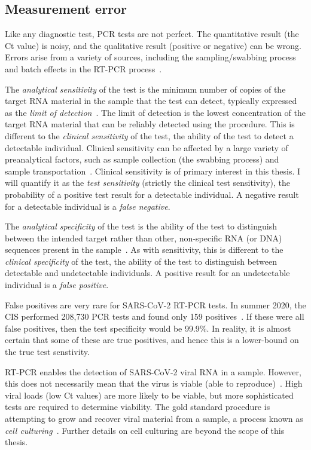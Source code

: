 \documentclass[thesis.tex]{subfiles}
\begin{document}
\subsection{Measurement error} \label{biology-data:sec:measurement-error}

Like any diagnostic test, PCR tests are not perfect.
The quantitative result (the Ct value) is noisy, and the qualitative result (positive or negative) can be wrong.
Errors arise from a variety of sources, including the sampling/swabbing process and batch effects in the RT-PCR process~\autocite{hanRTPCR}.

The \emph{analytical sensitivity} of the test is the minimum number of copies of the target RNA material in the sample that the test can detect, typically expressed as the \emph{limit of detection}~\autocite{bustinMIQE}.
The limit of detection is the lowest concentration of the target RNA material that can be reliably detected using the procedure.
This is different to the \emph{clinical sensitivity} of the test, the ability of the test to detect a detectable individual.
Clinical sensitivity can be affected by a large variety of preanalytical factors, such as sample collection (\ie the swabbing process) and sample transportation~\autocite{lippiPotential}.
Clinical sensitivity is of primary interest in this thesis.
I will quantify it as the \emph{test sensitivity} (strictly the clinical test sensitivity), the probability of a positive test result for a detectable individual.
A negative result for a detectable individual is a \emph{false negative}.

The \emph{analytical specificity} of the test is the ability of the test to distinguish between the intended target rather than other, non-specific RNA (or DNA) sequences present in the sample~\autocite{bustinMIQE}.
As with sensitivity, this is different to the \emph{clinical specificity} of the test, the ability of the test to distinguish between detectable and undetectable individuals.
A positive result for an undetectable individual is a \emph{false positive}.

False positives are very rare for SARS-CoV-2 RT-PCR tests.
In summer 2020, the CIS performed 208,730 PCR tests and found only 159 positives~\autocite[section 5]{cisMethodsONS}.
If these were all false positives, then the test specificity would be 99.9\%.
In reality, it is almost certain that some of these are true positives, and hence this is a lower-bound on the true test senstivity.

RT-PCR enables the detection of SARS-CoV-2 viral RNA in a sample.
However, this does not necessarily mean that the virus is viable (\ie able to reproduce)~\autocite{puhachSARSCoV2}.
High viral loads (low Ct values) are more likely to be viable, but more sophisticated tests are required to determine viability.
The gold standard procedure is attempting to grow and recover viral material from a sample, a process known as \emph{cell culturing}~\autocite{singanayagamDuration,puhachSARSCoV2,hakkiOnset}.
Further details on cell culturing are beyond the scope of this thesis.
\end{document}
